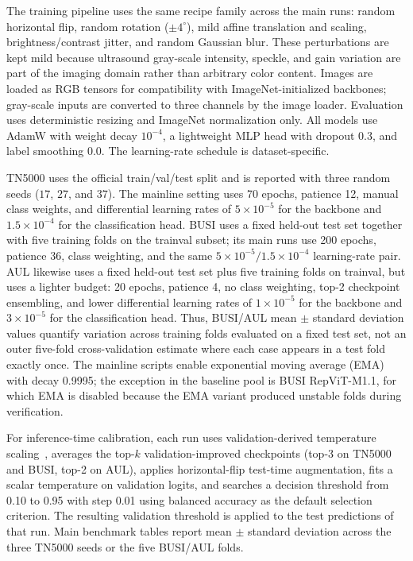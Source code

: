 The training pipeline uses the same recipe family across the main runs: random horizontal flip, random rotation ($\pm 4^\circ$), mild affine translation and scaling, brightness/contrast jitter, and random Gaussian blur. These perturbations are kept mild because ultrasound gray-scale intensity, speckle, and gain variation are part of the imaging domain rather than arbitrary color content. Images are loaded as RGB tensors for compatibility with ImageNet-initialized backbones; gray-scale inputs are converted to three channels by the image loader. Evaluation uses deterministic resizing and ImageNet normalization only. All models use AdamW with weight decay $10^{-4}$, a lightweight MLP head with dropout 0.3, and label smoothing 0.0. The learning-rate schedule is dataset-specific.

TN5000 uses the official train/val/test split and is reported with three random seeds ($17$, $27$, and $37$). The mainline setting uses 70 epochs, patience 12, manual class weights, and differential learning rates of $5 \times 10^{-5}$ for the backbone and $1.5 \times 10^{-4}$ for the classification head. BUSI uses a fixed held-out test set together with five training folds on the trainval subset; its main runs use 200 epochs, patience 36, class weighting, and the same $5 \times 10^{-5} / 1.5 \times 10^{-4}$ learning-rate pair. AUL likewise uses a fixed held-out test set plus five training folds on trainval, but uses a lighter budget: 20 epochs, patience 4, no class weighting, top-2 checkpoint ensembling, and lower differential learning rates of $1 \times 10^{-5}$ for the backbone and $3 \times 10^{-5}$ for the classification head. Thus, BUSI/AUL mean $\pm$ standard deviation values quantify variation across training folds evaluated on a fixed test set, not an outer five-fold cross-validation estimate where each case appears in a test fold exactly once. The mainline scripts enable exponential moving average (EMA) with decay 0.9995; the exception in the baseline pool is BUSI RepViT-M1.1, for which EMA is disabled because the EMA variant produced unstable folds during verification.

For inference-time calibration, each run uses validation-derived temperature scaling~\cite{guo2017calibration}, averages the top-$k$ validation-improved checkpoints (top-3 on TN5000 and BUSI, top-2 on AUL), applies horizontal-flip test-time augmentation, fits a scalar temperature on validation logits, and searches a decision threshold from 0.10 to 0.95 with step 0.01 using balanced accuracy as the default selection criterion. The resulting validation threshold is applied to the test predictions of that run. Main benchmark tables report mean $\pm$ standard deviation across the three TN5000 seeds or the five BUSI/AUL folds.

